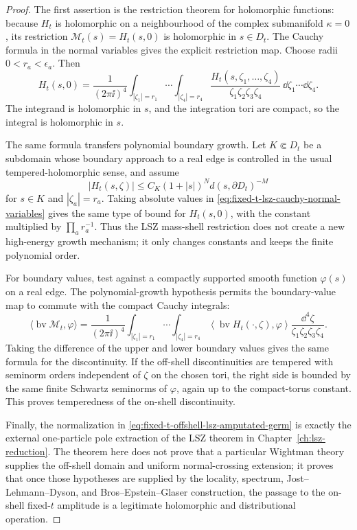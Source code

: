 \begin{proof}
The first assertion is the restriction theorem for holomorphic functions:
because \(H_t\) is holomorphic on a neighbourhood of the complex submanifold
\(\kappa=0\), its restriction \(\mathcal M_t(s)=H_t(s,0)\) is holomorphic in
\(s\in D_t\).  The Cauchy formula in the normal variables gives the explicit
restriction map.  Choose radii \(0<r_a<\epsilon_a\).  Then
\begin{equation}
  H_t(s,0)
  =
  \frac{1}{(2\pi\ii)^4}
  \int_{|\zeta_1|=r_1}\!\!\cdots\!\!
  \int_{|\zeta_4|=r_4}
  \frac{H_t(s,\zeta_1,\ldots,\zeta_4)}
       {\zeta_1\zeta_2\zeta_3\zeta_4}\,
  \dd\zeta_1\cdots\dd\zeta_4 .
  \label{eq:fixed-t-lsz-cauchy-normal-variables}
\end{equation}
The integrand is holomorphic in \(s\), and the integration tori are compact,
so the integral is holomorphic in \(s\).

The same formula transfers polynomial boundary growth.  Let \(K\Subset D_t\)
be a subdomain whose boundary approach to a real edge is controlled in the
usual tempered-holomorphic sense, and assume
\[
  |H_t(s,\zeta)|
  \le
  C_K(1+|s|)^N d(s,\partial D_t)^{-M}
\]
for \(s\in K\) and \(|\zeta_a|=r_a\).  Taking absolute values in
\eqref{eq:fixed-t-lsz-cauchy-normal-variables} gives the same type of bound
for \(H_t(s,0)\), with the constant multiplied by
\(\prod_a r_a^{-1}\).  Thus the LSZ mass-shell restriction does not create a
new high-energy growth mechanism; it only changes constants and keeps the
finite polynomial order.

For boundary values, test against a compactly supported smooth function
\(\varphi(s)\) on a real edge.  The polynomial-growth hypothesis permits the
boundary-value map to commute with the compact Cauchy integrals:
\begin{equation}
  \langle \operatorname{bv}\mathcal M_t,\varphi\rangle
  =
  \frac{1}{(2\pi\ii)^4}
  \int_{|\zeta_1|=r_1}\!\!\cdots\!\!
  \int_{|\zeta_4|=r_4}
  \left\langle
    \operatorname{bv}H_t(\cdot,\zeta),
    \varphi
  \right\rangle
  \frac{\dd^4\zeta}{\zeta_1\zeta_2\zeta_3\zeta_4}.
  \label{eq:fixed-t-lsz-boundary-cauchy-commutation}
\end{equation}
Taking the difference of the upper and lower boundary values gives the same
formula for the discontinuity.  If the off-shell discontinuities are tempered
with seminorm orders independent of \(\zeta\) on the chosen tori, the right
side is bounded by the same finite Schwartz seminorms of \(\varphi\), again up
to the compact-torus constant.  This proves temperedness of the on-shell
discontinuity.

Finally, the normalization in
\eqref{eq:fixed-t-offshell-lsz-amputated-germ} is exactly the external
one-particle pole extraction of the LSZ theorem in
Chapter~\ref{ch:lsz-reduction}.  The theorem here does not prove that a
particular Wightman theory supplies the off-shell domain and uniform
normal-crossing extension; it proves that once those hypotheses are supplied
by the locality, spectrum, Jost--Lehmann--Dyson, and
Bros--Epstein--Glaser construction, the passage to the on-shell fixed-\(t\)
amplitude is a legitimate holomorphic and distributional operation.
\end{proof}

